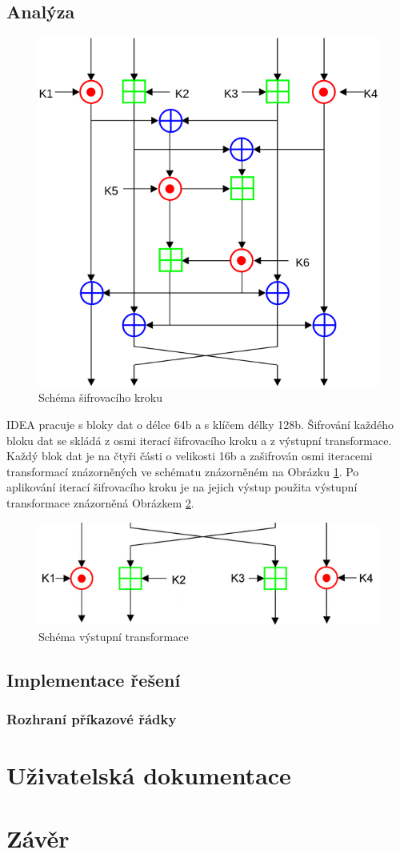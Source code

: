 \documentclass[12pt,a4paper]{article}
\let\oldsection\section
\renewcommand\section{\clearpage\oldsection}
\begin{document}
\subsection{Analýza}
\begin{figure}[h]
	\centering
	\includegraphics[width=0.4\linewidth]{img/fig_idea-step.png}
	\caption{Schéma šifrovacího kroku \cite{wiki.IDEA}}
	\label{fig:idea-step}
\end{figure}

IDEA pracuje s bloky dat o délce 64b a s klíčem délky 128b. Šifrování každého bloku dat se skládá z osmi iterací šifrovacího kroku a z výstupní transformace.
Každý blok dat je na čtyři části o velikosti 16b a zašifrován osmi iteracemi transformací znázorněných ve schématu znázorněném na Obrázku \ref{fig:idea-step}. Po aplikování iterací šifrovacího kroku je na jejich výstup použita výstupní transformace znázorněná Obrázkem \ref{fig:idea-half-step}.

\begin{figure}[h]
	\centering
	\includegraphics[width=0.4\linewidth]{img/fig_idea-half-step.png}
	\caption{Schéma výstupní transformace \cite{wiki.IDEA}}
	\label{fig:idea-half-step}
\end{figure}


\subsection{Implementace řešení}

\subsubsection{Rozhraní příkazové řádky}

\section{Uživatelská dokumentace}

\section{Závěr}


{\raggedright\small
	
}

\end{document}
